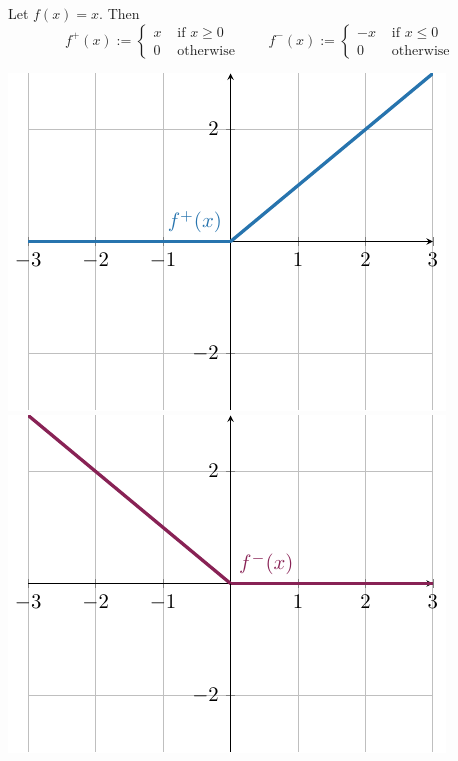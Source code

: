     \begin{example}
        Let $f(x) = x$. Then $$f^+(x) := \left\{
		\begin{array}{ll}
			x & \text{ if } x \geq 0 \\
			0 & \text{ otherwise}
		\end{array}
		\right. \qquad f^-(x) := \left\{
		\begin{array}{ll}
			-x & \text{ if } x \leq 0 \\
			0 & \text{ otherwise}
		\end{array}
		\right.
  $$

\begin{center}
      \includegraphics[scale=.8]{chapters/4-IntegrationRn/figures/figures-fplus.pdf}
      \includegraphics[scale=.8]{chapters/4-IntegrationRn/figures/figures-fminus.pdf}
\end{center}
    \end{example}
    
